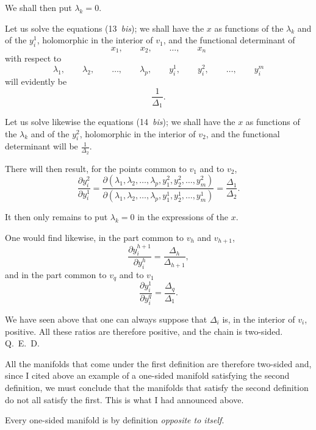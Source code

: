 \documentclass{article}
\begin{document}
We shall then put $\lambda_{k} = 0$.

Let us solve the equations (13~\emph{bis}); we shall have the $x$ as functions of the $\lambda_{k}$ and of the $y^{1}_{i}$, holomorphic in the interior of $v_{1}$, and the functional determinant of
\[
x_{1}, \qquad x_{2}, \qquad \ldots, \qquad x_{n}
\]
with respect to
\[
\lambda_{1}, \qquad \lambda_{2}, \qquad \ldots, \qquad \lambda_{p}, \qquad y^{1}_{i}, \qquad y^{2}_{i}, \qquad \ldots, \qquad y^{m}_{i}
\]
 will evidently be
\[
\frac{1}{\Delta_{1}}.
\]

Let us solve likewise the equations (14~\emph{bis}); we shall have the $x$ as functions of the $\lambda_{k}$ and of the $y^{2}_{i}$, holomorphic in the interior of $v_{2}$, and the functional determinant will be $\frac{1}{\Delta_{2}}$.

There will then result, for the points common to $v_{1}$ and to $v_{2}$,
\[
\frac{\partial y^{2}_{i}}{\partial y^{1}_{i}} = \frac{\partial(\lambda_{1}, \lambda_{2}, \ldots, \lambda_{p}, y^{2}_{1}, y^{2}_{2}, \ldots, y^{2}_{m})}{\partial(\lambda_{1}, \lambda_{2}, \ldots, \lambda_{p}, y^{1}_{1}, y^{1}_{2}, \ldots, y^{1}_{m})} = \frac{\Delta_{1}}{\Delta_{2}}.
\]

It then only remains to put $\lambda_{k} = 0$ in the expressions of the $x$.

One would find likewise, in the part common to $v_{h}$ and $v_{h+1}$,
\[
\frac{\partial y^{h+1}_{i}}{\partial y^{h}_{i}} = \frac{\Delta_{h}}{\Delta_{h+1}},
\]
and in the part common to $v_{q}$ and to $v_{1}$
\[
\frac{\partial y^{1}_{i}}{\partial y^{q}_{i}} = \frac{\Delta_{q}}{\Delta_{1}}.
\]

We have seen above that one can always suppose that $\Delta_{i}$ is,
in the interior of $v_{i}$, positive. All these ratios are therefore positive, and the chain is two-sided. Q.~E.~D.

All the manifolds that come under the first definition are therefore two-sided and, since I cited above an example of a one-sided manifold satisfying the second definition, we must conclude that the manifolds that satisfy the second definition do not all satisfy the first. This is what I had announced above.

Every one-sided manifold is by definition \emph{opposite to itself}.
\end{document}
